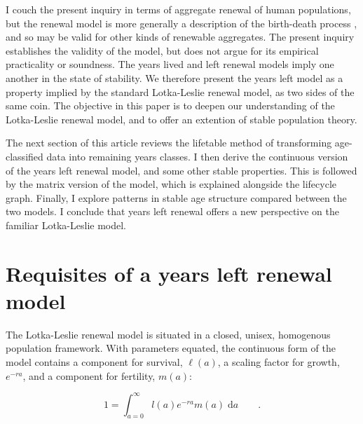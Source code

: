 \documentclass[12pt,oneside,a4paper,leqno]{article}
\newcommand{\dd}{\; \mathrm{d}}
\newcommand{\ep}{\quad\quad\text{.}}
\begin{document}
I couch the present inquiry in terms of aggregate renewal of human populations,
but the renewal model is more generally a description of the birth-death
process \citep{cox1962,feller1941integral}, and so may be valid for other kinds
of renewable aggregates.
The present inquiry establishes the validity of the model, but does not argue
for its empirical practicality or soundness.
The years lived and left renewal models imply one another in the state of stability. We
therefore present the years left model as a property implied by the
standard Lotka-Leslie renewal model, as two sides of the same coin. The objective in this paper is to deepen
our understanding of the Lotka-Leslie renewal model, and to offer an extention
of stable population theory.

The next section of this article reviews the lifetable method of transforming
age-classified data into remaining years classes. I then derive the continuous version of
the years left renewal model, and some other stable properties. This is
followed by the matrix version of the model, which is explained alongside the
lifecycle graph. Finally, I explore patterns in stable age structure compared
between the two models. I conclude that years left renewal offers
a new perspective on the familiar Lotka-Leslie model.

\section*{Requisites of a years left renewal model}
The Lotka-Leslie renewal model \citep{leslie1945use,sharpe1911problem} is
situated in a closed, unisex, homogenous population framework. With
parameters equated, the continuous form of the model contains a component for
survival, $\ell(a)$, a scaling factor for growth, $e^{-ra}$, and a component for fertility, $m(a)$:

\begin{equation}
\label{eq:lotka}
1 = \int_{a=0}^\infty l(a)e^{-ra}m(a)\dd a \ep
\end{equation}
\end{document}
